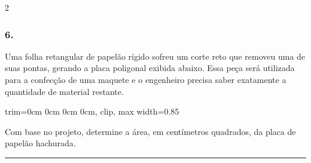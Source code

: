 \documentclass[twoside, 10pt, a4paper]{article}
\newlength{\espacoPreQuestao}\setlength{\espacoPreQuestao}{0.1cm}
\newlength{\espacoQuestao}\setlength{\espacoQuestao}{0.2cm}
\newcommand{\larguraTikz}{0.85\linewidth}
\begin{document}
\begin{multicols*}{2}
\subsubsection*{6.} Uma folha retangular de papelão rígido sofreu um corte reto que removeu uma de suas pontas, gerando a placa poligonal exibida abaixo. Essa peça será utilizada para a confecção de uma maquete e o engenheiro precisa saber exatamente a quantidade de material restante.
\begin{center}
\begin{adjustbox}{trim=0cm 0cm 0cm 0cm, clip, max width=\larguraTikz}
\end{adjustbox}
\end{center}
Com base no projeto, determine a área, em centímetros quadrados, da placa de papelão hachurada.
\par\vspace{\espacoQuestao}

\noindent\textcolor{CorLinha}{\rule{\linewidth}{0.5pt}} 
\par\vspace{\espacoPreQuestao}

\end{multicols*}
\end{document}

